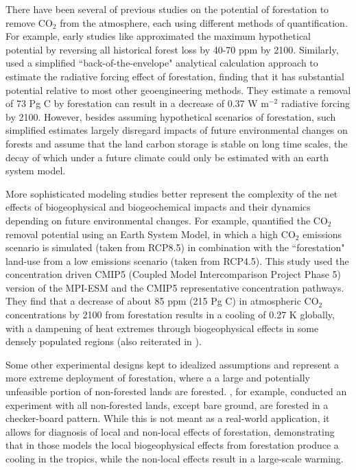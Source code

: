 \documentclass[]{article}
\begin{document}
There have been several of previous studies on the potential of forestation to remove CO$_2$ from the atmosphere, each using different methods of quantification.
For example, early studies like \cite{house_maximum_2002} approximated the maximum hypothetical potential by reversing all historical forest loss by 40-70 ppm by 2100. Similarly, \cite{lenton_radiative_2009} used a simplified ``back-of-the-envelope" analytical calculation approach to estimate the radiative forcing effect of forestation, finding that it has substantial potential relative to most other geoengineering methods.
They estimate a removal of 73 Pg C by forestation can result in a decrease of 0.37 W m$^{-2}$ radiative forcing by 2100.
However, besides assuming hypothetical scenarios of forestation, such simplified estimates largely disregard impacts of future environmental changes on forests and assume that the land carbon storage is stable on long time scales, the decay of which under a future climate could only be estimated with an earth system model.

More sophisticated modeling studies better represent the complexity of the net effects of biogeophysical and biogeochemical impacts and their dynamics depending on future environmental changes.
For example, \cite{sonntag_reforestation_2016} quantified the CO$_2$ removal potential using an Earth System Model, in which a high CO$_2$ emissions scenario is simulated (taken from RCP8.5) in combination with the ``forestation" land-use from a low emissions scenario (taken from RCP4.5).
This study used the concentration driven CMIP5 (Coupled Model Intercomparison Project Phase 5) version of the MPI-ESM and the CMIP5 representative concentration pathways.
They find that a decrease of about 85 ppm (215 Pg C) in atmospheric CO$_2$ concentrations by 2100 from forestation results in a cooling of 0.27 K globally, with a dampening of heat extremes through biogeophysical effects in some densely populated regions (also reiterated in \cite{sonntag_quantifying_2018}).

Some other experimental designs kept to idealized assumptions and represent a more extreme deployment of forestation, where a a large and potentially unfeasible portion of non-forested lands are forested.
\cite{de_hertog_biogeophysical_2022}, for example, conducted an experiment with all non-forested lands, except bare ground, are forested in a checker-board pattern.
While this is not meant as a real-world application, it allows for diagnosis of local and non-local effects of forestation, demonstrating that in those models the local biogeophysical effects from forestation produce a cooling in the tropics, while the non-local effects result in a large-scale warming.
\end{document}

